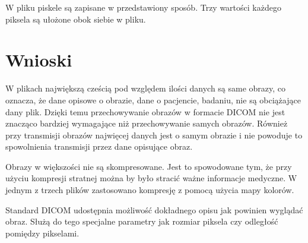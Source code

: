 \documentclass[11pt,a4paper]{article}
\begin{document}
W pliku piskele są zapisane w przedstawiony sposób. Trzy wartości każdego piksela są ułożone obok siebie w pliku.

\section{Wnioski}
W plikach największą cześcią pod względem ilości danych są same obrazy, co oznacza, że dane opisowe o obrazie, dane o pacjencie, badaniu, nie są obciążające dany plik. Dzięki temu przechowywanie obrazów w formacie DICOM nie jest znacząco bardziej wymagające niż przechowywanie samych obrazów. Również przy transmisji obrazów najwięcej danych jest o samym obrazie i nie powoduje to spowolnienia transmisji przez dane opisujące obraz.

Obrazy w większości nie są skompresowane. Jest to spowodowane tym, że przy użyciu kompresji stratnej można by było stracić ważne informacje medyczne. W jednym z trzech plików zastosowano kompresję z pomocą użycia mapy kolorów.

Standard DICOM udostępnia możliwość dokładnego opisu jak powinien wyglądać obraz. Służą do tego specjalne parametry jak rozmiar piksela czy odległość pomiędzy pikselami.
\end{document}
